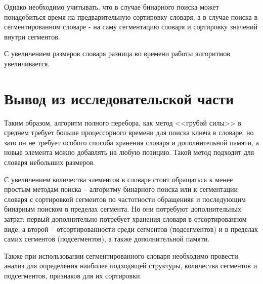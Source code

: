 Однако необходимо учитывать, что в случае бинарного поиска может понадобиться время на предварительную сортировку словаря, а в случае поиска в сегментированном словаре - на саму сегментацию словаря и сортировку значений внутри сегментов.

С увеличением размеров словаря разница во времени работы алгоритмов увеличивается.






\clearpage
\section{Вывод из исследовательской части}

Таким образом, алгоритм полного перебора, как метод <<грубой силы>> в среднем требует больше процессорного времени для поиска ключа в словаре, но зато он не требует особого способа хранения словаря и дополнительной памяти, а новые элемента можно добавлять на любую позицию. Такой метод подходит для словаря небольших размеров.

С увеличением количества элементов в словаре стоит обращаться к менее простым методам поиска -- алгоритму бинарного поиска или к сегментации словаря с сортировкой сегментов по частотности обращенияя и последующим бинарным поиском в пределах сегмента. Но они потребуют дополнительных затрат: первый дополнительно потребует  хранения словаря в отсортированном виде, а второй -- отсортированности среди сегментов (подсегментов) и в пределах самих сегментов (подсегментов), а также дополнительной памяти.

Также при использовании сегментированного словаря необходимо провести анализ для определения наиболее подходящей структуры, количества сегментов и подсегментов, признаков для их сортировки.